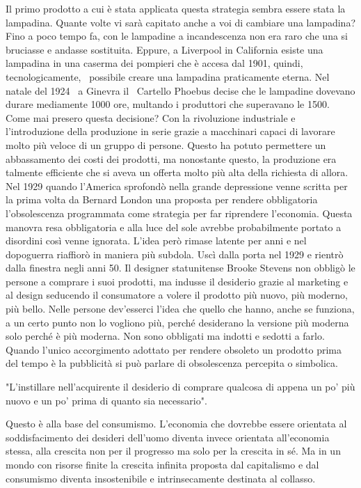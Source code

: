 \documentclass[12pt]{book} %
\begin{document}
Il primo prodotto a cui è stata applicata questa strategia sembra essere stata la lampadina. Quante volte vi sarà
capitato anche a voi di cambiare una lampadina? Fino a poco tempo fa, con le lampadine a incandescenza non era raro che
una si bruciasse e andasse sostituita. Eppure, a Liverpool in California esiste una lampadina in una caserma dei
pompieri che è accesa dal 1901, quindi, tecnologicamente, \ possibile creare una lampadina praticamente eterna. Nel
natale del 1924 \ a Ginevra il \ Cartello Phoebus decise che le lampadine dovevano durare mediamente 1000 ore, multando
i produttori che superavano le 1500. Come mai presero questa decisione? Con la rivoluzione industriale e
l'introduzione della produzione in serie grazie a macchinari capaci di lavorare molto più veloce
di un gruppo di persone. Questo ha potuto permettere un abbassamento dei costi dei prodotti, ma nonostante questo, la
produzione era talmente efficiente che si aveva un offerta molto più alta della richiesta di allora. Nel 1929 quando
l'America sprofondò nella grande depressione venne scritta per la prima volta da Bernard London
una proposta per rendere obbligatoria l'obsolescenza programmata come strategia per far riprendere
l'economia. Questa manovra resa obbligatoria e alla luce del sole avrebbe probabilmente portato a
disordini così venne ignorata. L'idea però rimase latente per anni e nel dopoguerra riaffiorò in
maniera più subdola. Uscì dalla porta nel 1929 e rientrò dalla finestra negli anni 50. Il designer statunitense Brooke
Stevens non obbligò le persone a comprare i suoi prodotti, ma indusse il desiderio grazie al marketing e al design
seducendo il consumatore a volere il prodotto più nuovo, più moderno, più bello. Nelle persone
dev'esserci l'idea che quello che hanno, anche se funziona, a un certo punto
non lo vogliono più, perché desiderano la versione più moderna solo perché è più moderna. Non sono obbligati ma indotti
e sedotti a farlo. Quando l'unico accorgimento adottato per rendere obsoleto un prodotto prima del tempo è la
pubblicità si può parlare di obsolescenza percepita o
simbolica. 

"L'instillare nell'acquirente il desiderio di comprare qualcosa di appena un po' più nuovo e un po'
prima di quanto sia necessario".

Questo è alla base del consumismo. L'economia che dovrebbe essere orientata al soddisfacimento dei
desideri dell'uomo diventa invece orientata all'economia stessa, alla
crescita non per il progresso ma solo per la crescita in sé. Ma in un mondo con risorse finite la crescita infinita
proposta dal capitalismo e dal consumismo diventa insostenibile e intrinsecamente destinata al collasso.
\end{document}
